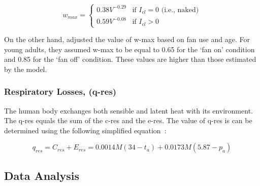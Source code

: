 
\begin{equation}
    w_{max}=
\begin{cases}
    0.38 V^{-0.29} & \text{if } I_{cl} = 0 \text{ (i.e., naked)} \\
    0.59 V^{-0.08} & \text{if } I_{cl} > 0
\end{cases}
\end{equation}

On the other hand,  adjusted the value of \ac{w-max} based on fan use and age.
For young adults, they assumed \ac{w-max} to be equal to 0.65 for the `fan on' condition and 0.85 for the `fan off' condition.
These values are higher than those estimated by the  model.

\subsubsection{Respiratory Losses, (\acs{q-res})}
The human body exchanges both sensible and latent heat with its environment.
The \acf{q-res} equals the sum of the \ac{c-res} and the \ac{e-res}.
The value of \ac{q-res} is can be determined using the following simplified equation~\cite{ASHRA2017}:

\begin{equation}
    q_{res} = C_{res} + E_{res} = 0.0014M(34-t_{a}) + 0.0173M(5.87-p_{a})\label{eq:respiratory-losses}
\end{equation}

\subsection{Data Analysis}\label{subsec:data-analysis}

